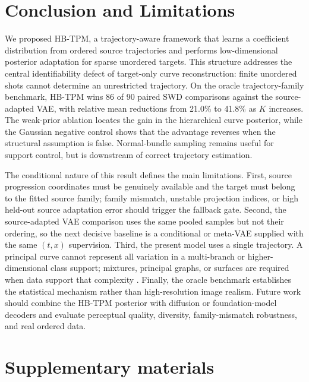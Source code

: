 \documentclass{article}
\begin{document}
\newpage
\section{Conclusion and Limitations}
We proposed HB-TPM, a trajectory-aware framework that learns a coefficient distribution from ordered source trajectories and performs low-dimensional posterior adaptation for sparse unordered targets. This structure addresses the central identifiability defect of target-only curve reconstruction: finite unordered shots cannot determine an unrestricted trajectory. On the oracle trajectory-family benchmark, HB-TPM wins 86 of 90 paired SWD comparisons against the source-adapted VAE, with relative mean reductions from 21.0\% to 41.8\% as $K$ increases. The weak-prior ablation locates the gain in the hierarchical curve posterior, while the Gaussian negative control shows that the advantage reverses when the structural assumption is false. Normal-bundle sampling remains useful for support control, but is downstream of correct trajectory estimation.

The conditional nature of this result defines the main limitations. First, source progression coordinates must be genuinely available and the target must belong to the fitted source family; family mismatch, unstable projection indices, or high held-out source adaptation error should trigger the fallback gate. Second, the source-adapted VAE comparison uses the same pooled samples but not their ordering, so the next decisive baseline is a conditional or meta-VAE supplied with the same $(t,x)$ supervision. Third, the present model uses a single trajectory. A principal curve cannot represent all variation in a multi-branch or higher-dimensional class support; mixtures, principal graphs, or surfaces are required when data support that complexity \citep{ozertem2011locally, hauberg2015principal, han2026few}. Finally, the oracle benchmark establishes the statistical mechanism rather than high-resolution image realism. Future work should combine the HB-TPM posterior with diffusion or foundation-model decoders and evaluate perceptual quality, diversity, family-mismatch robustness, and real ordered data.


%

\section{Supplementary materials}
\end{document}
